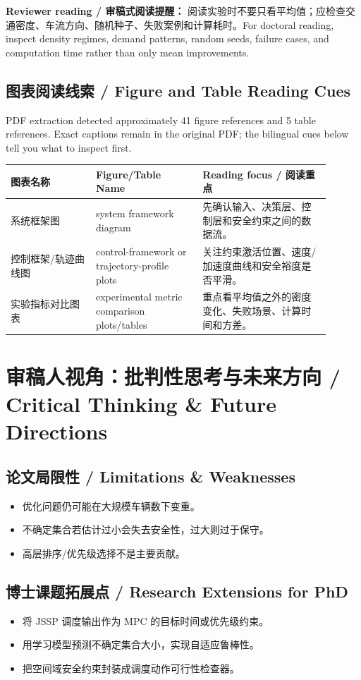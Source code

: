 \documentclass[UTF8,a4paper,11pt,fontset=fandol]{ctexart}
\begin{document}
\textbf{Reviewer reading / 审稿式阅读提醒：} 阅读实验时不要只看平均值；应检查交通密度、车流方向、随机种子、失败案例和计算耗时。For doctoral reading, inspect density regimes, demand patterns, random seeds, failure cases, and computation time rather than only mean improvements.

\subsection{图表阅读线索 / Figure and Table Reading Cues}
PDF extraction detected approximately 41 figure references and 5 table references. Exact captions remain in the original PDF; the bilingual cues below tell you what to inspect first.

\begin{longtable}{p{0.24\linewidth}p{0.30\linewidth}p{0.36\linewidth}}
\toprule
图表名称 & Figure/Table Name & Reading focus / 阅读重点\\
\midrule
系统框架图 & system framework diagram & 先确认输入、决策层、控制层和安全约束之间的数据流。 \\
控制框架/轨迹曲线图 & control-framework or trajectory-profile plots & 关注约束激活位置、速度/加速度曲线和安全裕度是否平滑。 \\
实验指标对比图表 & experimental metric comparison plots/tables & 重点看平均值之外的密度变化、失败场景、计算时间和方差。 \\
\bottomrule
\end{longtable}

\section{审稿人视角：批判性思考与未来方向 / Critical Thinking \& Future Directions}
\subsection{论文局限性 / Limitations \& Weaknesses}
\begin{itemize}
\item 优化问题仍可能在大规模车辆数下变重。
\item 不确定集合若估计过小会失去安全性，过大则过于保守。
\item 高层排序/优先级选择不是主要贡献。
\end{itemize}


\subsection{博士课题拓展点 / Research Extensions for PhD}
\begin{itemize}
\item 将 JSSP 调度输出作为 MPC 的目标时间或优先级约束。
\item 用学习模型预测不确定集合大小，实现自适应鲁棒性。
\item 把空间域安全约束封装成调度动作可行性检查器。
\end{itemize}
\end{document}
